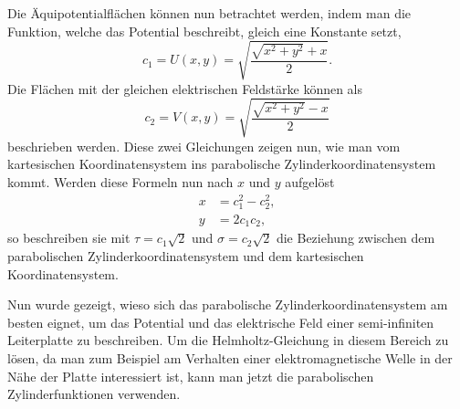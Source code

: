
Die Äquipotentialflächen können nun betrachtet werden, 
indem man die Funktion, welche das Potential beschreibt, gleich eine Konstante setzt,
\begin{equation}
	c_1 = U(x,y) = \sqrt{\frac{\sqrt{x^2+y^2} + x}{2}}.
\end{equation}
Die Flächen mit der gleichen elektrischen Feldstärke können als
\begin{equation}
	c_2 = V(x,y) = \sqrt{\frac{\sqrt{x^2+y^2} - x}{2}}
\end{equation}
beschrieben werden. Diese zwei Gleichungen zeigen nun, wie man vom 
kartesischen Koordinatensystem ins parabolische Zylinderkoordinatensystem kommt.
Werden diese Formeln nun nach $x$ und $y$ aufgelöst 
\begin{align}
	x &=  c_1^2 - c_2^2 ,\\
	y &= 2c_1 c_2,
\end{align}
so beschreiben sie mit $\tau = c_1 \sqrt{2}$ und $\sigma = c_2 \sqrt{2}$ die Beziehung 
zwischen dem parabolischen Zylinderkoordinatensystem und dem kartesischen Koordinatensystem.

Nun wurde gezeigt, wieso sich das parabolische Zylinderkoordinatensystem am besten eignet, um 
das Potential und das elektrische Feld einer semi-infiniten Leiterplatte zu beschreiben.
Um die Helmholtz-Gleichung in diesem Bereich zu lösen, 
da man zum Beispiel am Verhalten einer elektromagnetische Welle in der Nähe 
der Platte interessiert ist, kann man jetzt die parabolischen Zylinderfunktionen verwenden. 

